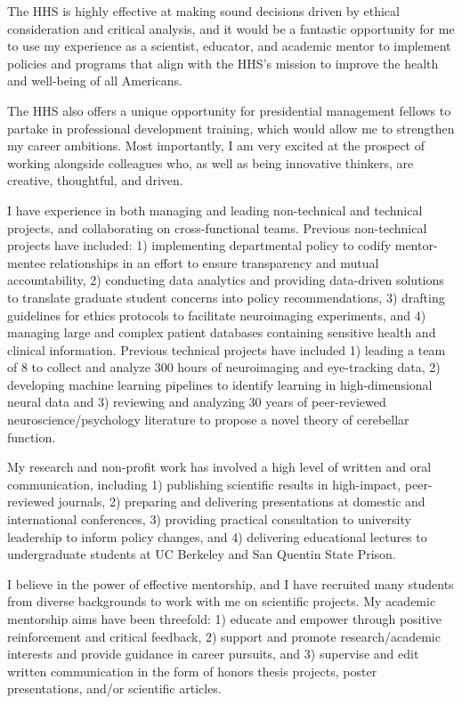 \documentclass[11pt, a4paper]{maedbh-cv}
\begin{document}
\begin{cvletter}
The HHS is highly effective at making sound decisions driven by ethical consideration and critical analysis, and it would be a fantastic opportunity for me to use my experience as a scientist, educator, and academic mentor to implement policies and programs that align with the HHS's mission to improve the health and well-being of all Americans.  

The HHS also offers a unique opportunity for presidential management fellows to partake in professional development training, which would allow me to strengthen my career ambitions. Most importantly, I am very excited at the prospect of working alongside colleagues who, as well as being innovative thinkers, are creative, thoughtful, and driven. 

I have experience in both managing and leading non-technical and technical projects, and collaborating on cross-functional teams. Previous non-technical projects have included: 1) implementing departmental policy to codify mentor-mentee relationships in an effort to ensure transparency and mutual accountability, 2) conducting data analytics and providing data-driven solutions to translate graduate student concerns into policy recommendations, 3) drafting guidelines for ethics protocols to facilitate neuroimaging experiments, and 4) managing large and complex patient databases containing sensitive health and clinical information. Previous technical projects have included 1) leading a team of 8 to collect and analyze 300 hours of neuroimaging and eye-tracking data, 2) developing machine learning pipelines to identify learning in high-dimensional neural data and 3) reviewing and analyzing 30 years of peer-reviewed neuroscience/psychology literature to propose a novel theory of cerebellar function.

	My research and non-profit work has involved a high level of written and oral communication, including 1) publishing scientific results in high-impact, peer-reviewed journals, 2) preparing and delivering presentations at domestic and international conferences, 3) providing practical consultation to university leadership to inform policy changes, and 4) delivering educational lectures to undergraduate students at UC Berkeley and San Quentin State Prison. 

	I believe in the power of effective mentorship, and I have recruited many students from diverse backgrounds to work with me on scientific projects. My academic mentorship aims have been threefold: 1) educate and empower through positive reinforcement and critical feedback, 2) support and promote research/academic interests and provide guidance in career pursuits, and 3) supervise and edit written communication in the form of honors thesis projects, poster presentations, and/or scientific articles. 


\end{cvletter}
\end{document}
